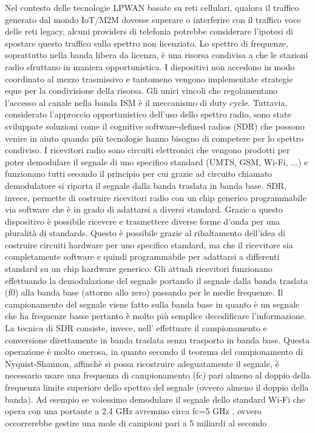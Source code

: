 \documentclass[12pt,a4paper,openright,twoside]{report}
\begin{document}
Nel contesto delle tecnologie LPWAN basate su reti cellulari, qualora il traffico generato dal mondo IoT/M2M dovesse superare o interferire con il traffico voce delle reti legacy, alcuni providers di telefonia potrebbe considerare l'ipotesi di spostare questo traffico sullo spettro non licenziato.
Lo spettro di frequenze, soprattutto nella banda libera da licenza, \`e una risorsa condivisa a che le stazioni radio sfruttano in maniera opportunistica. I dispositivi non accedono in modo coordinato al mezzo trasmissivo e tantomeno vengono implementate strategie eque per la condivisione della risorsa. Gli unici vincoli che regolamentano l'accesso al canale nella banda ISM \`e il meccanismo di duty cycle. 
Tuttavia, considerato l'approccio opportunistico dell'uso dello spettro radio, sono state sviluppate soluzioni come il cognitive software-defined radios (SDR) che possono venire in aiuto quando pi\`u tecnologie hanno bisogno di competere per lo spettro condiviso.
I ricevitori radio sono circuiti elettronici che vengono prodotti per poter demodulare il segnale di uno specifico standard (UMTS, GSM, Wi-Fi, ...) e funzionano tutti secondo il principio per cui grazie ad circuito chiamato demodulatore si riporta il segnale dalla banda traslata in banda base. 
SDR, invece, permette di costruire ricevitori radio con un chip generico programmabile via software che \`e in grado di adattarsi a diversi standard. Grazie a questo dispositivo \`e possibile ricevere e trasmettere diverse forme d'onda per una pluralit\`a di standards. 
Questo \`e possibile grazie al ribaltamento dell'idea di costruire circuiti hardware per uno specifico standard, ma che il ricevitore sia completamente software e quindi programmabile per adattarsi a differenti standard su un chip hardware generico. 
Gli attuali ricevitori funzionano effettuando la demodulazione del segnale portando il segnale dalla banda traslata (f0) alla banda base (attorno allo zero) passando per le medie frequenze. 
Il campionamento del segnale viene fatto sulla banda base in quanto \`e un segnale che ha frequenze basse pertanto \`e molto pi\`u semplice decodificare l'informazione. 
La tecnica di SDR consiste, invece, nell' effettuare il campionamento e conversione direttamente in banda traslata senza trasporto in banda base. Questa operazione \`e molto onerosa, in quanto secondo il teorema del campionamento di  Nyquist-Shannon, affinch\`e si possa ricostruire adeguatamente il segnale, \`e necessario usare una frequenza di campionamento (fc) pari almeno al doppio della frequenza limite superiore dello spettro del segnale (ovvero almeno il doppio della banda). Ad esempio se volessimo demodulare il segnale dello standard Wi-Fi che opera con una portante a 2.4 GHz avremmo circa fc=5 GHz , ovvero occorrerebbe gestire una mole di campioni pari a 5 miliardi al secondo \cite{K14}
\end{document}
